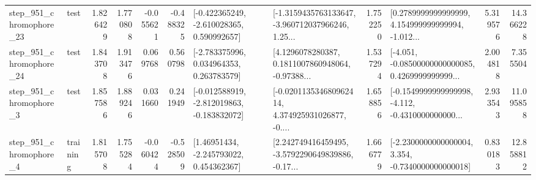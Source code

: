 \begin{tabular}{llrrrrllrlrr}
  step\_951\_chromophore\_23 &      test &      1.826429 &    1.770808 &     -0.055621 & -0.488325 &   [-0.422365249, -2.610028365, 0.590992657] &  [-1.3159435763133647, -3.960712037966246, 1.25... &       1.752250 &  [0.2789999999999999, 4.154999999999994, -1.012... &            5.319576 &         14.366228 \\
  step\_951\_chromophore\_24 &      test &      1.843708 &    1.913476 &      0.069768 &  0.560798 &    [-2.783375996, 0.034964353, 0.263783579] &  [4.1296078280387, 0.1811007860948064, -0.97388... &       1.537294 &  [-4.051, -0.08500000000000085, 0.4269999999999... &            2.004818 &          7.355504 \\
   step\_951\_chromophore\_3 &      test &      1.857586 &    1.889246 &      0.031660 &  0.241949 &  [-0.012588919, -2.812019863, -0.183832072] &  [-0.020113534680962414, 4.374925931026877, -0.... &       1.658856 &  [-0.1549999999999998, -4.112, -0.4310000000000... &            2.933543 &         11.095858 \\
   step\_951\_chromophore\_4 &  training &      1.815708 &    1.755284 &     -0.060424 & -0.528509 &     [1.46951434, -2.245793022, 0.454362367] &  [2.242749416459495, -3.5792290649839886, -0.17... &       1.666779 &  [-2.2300000000000004, 3.354, -0.7340000000000018] &            0.830183 &         12.858812 \\
\bottomrule
\end{tabular}

